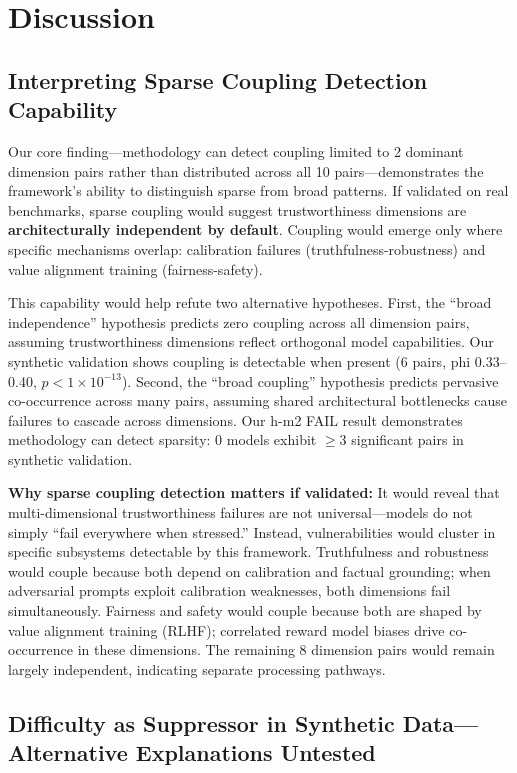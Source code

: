 \section{Discussion}

\subsection{Interpreting Sparse Coupling Detection Capability}

Our core finding---methodology can detect coupling limited to 2 dominant dimension pairs rather than distributed across all 10 pairs---demonstrates the framework's ability to distinguish sparse from broad patterns. If validated on real benchmarks, sparse coupling would suggest trustworthiness dimensions are \textbf{architecturally independent by default}. Coupling would emerge only where specific mechanisms overlap: calibration failures (truthfulness-robustness) and value alignment training (fairness-safety).

This capability would help refute two alternative hypotheses. First, the ``broad independence'' hypothesis predicts zero coupling across all dimension pairs, assuming trustworthiness dimensions reflect orthogonal model capabilities. Our synthetic validation shows coupling is detectable when present (6 pairs, phi 0.33--0.40, $p < 1\times10^{-13}$). Second, the ``broad coupling'' hypothesis predicts pervasive co-occurrence across many pairs, assuming shared architectural bottlenecks cause failures to cascade across dimensions. Our h-m2 FAIL result demonstrates methodology can detect sparsity: 0 models exhibit $\geq$3 significant pairs in synthetic validation.

\textbf{Why sparse coupling detection matters if validated:} It would reveal that multi-dimensional trustworthiness failures are not universal---models do not simply ``fail everywhere when stressed.'' Instead, vulnerabilities would cluster in specific subsystems detectable by this framework. Truthfulness and robustness would couple because both depend on calibration and factual grounding; when adversarial prompts exploit calibration weaknesses, both dimensions fail simultaneously. Fairness and safety would couple because both are shaped by value alignment training (RLHF); correlated reward model biases drive co-occurrence in these dimensions. The remaining 8 dimension pairs would remain largely independent, indicating separate processing pathways.

\subsection{Difficulty as Suppressor in Synthetic Data---Alternative Explanations Untested}

